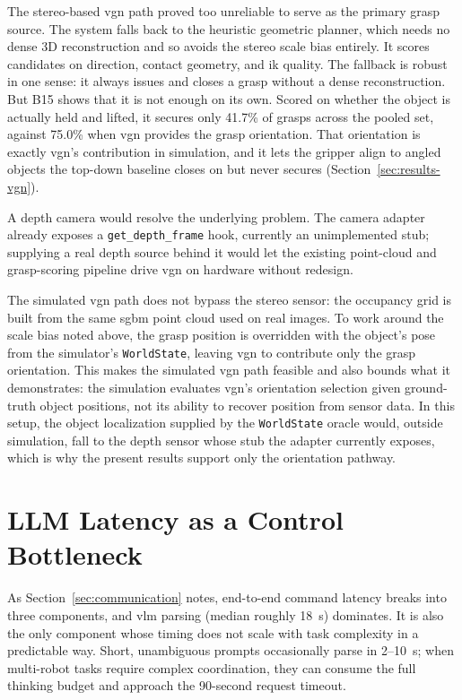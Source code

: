 \documentclass[
     12pt,
     a4paper,
     BCOR=10mm,
     DIV=14,
     listof=totoc,
     bibliography=totoc,
     parskip,
     twoside,
     headsepline
     ]{scrreprt}
\begin{document}
The stereo-based \gls{vgn} path proved too unreliable to serve as the primary grasp source. The system falls back to the heuristic geometric planner, which needs no dense 3D reconstruction and so avoids the stereo scale bias entirely. It scores candidates on direction, contact geometry, and \gls{ik} quality. The fallback is robust in one sense: it always issues and closes a grasp without a dense reconstruction. But B15 shows that it is not enough on its own. Scored on whether the object is actually held and lifted, it secures only 41.7\% of grasps across the pooled set, against 75.0\% when \gls{vgn} provides the grasp orientation. That orientation is exactly \gls{vgn}'s contribution in simulation, and it lets the gripper align to angled objects the top-down baseline closes on but never secures (Section~\ref{sec:results-vgn}).

A depth camera would resolve the underlying problem. The camera adapter already exposes a \texttt{get\_depth\_frame} hook, currently an unimplemented stub; supplying a real depth source behind it would let the existing point-cloud and grasp-scoring pipeline drive \gls{vgn} on hardware without redesign.

The simulated \gls{vgn} path does not bypass the stereo sensor: the occupancy grid is built from the same \gls{sgbm} point cloud used on real images. To work around the scale bias noted above, the grasp position is overridden with the object's pose from the simulator's \texttt{WorldState}, leaving \gls{vgn} to contribute only the grasp orientation. This makes the simulated \gls{vgn} path feasible and also bounds what it demonstrates: the simulation evaluates \gls{vgn}'s orientation selection given ground-truth object positions, not its ability to recover position from sensor data. In this setup, the object localization supplied by the \texttt{WorldState} oracle would, outside simulation, fall to the depth sensor whose stub the adapter currently exposes, which is why the present results support only the orientation pathway.

\section{LLM Latency as a Control Bottleneck}
As Section~\ref{sec:communication} notes, end-to-end command latency breaks into three components, and \gls{vlm} parsing (median roughly 18~s) dominates. It is also the only component whose timing does not scale with task complexity in a predictable way. Short, unambiguous prompts occasionally parse in 2--10~s; when multi-robot tasks require complex coordination, they can consume the full thinking budget and approach the 90-second request timeout.
\end{document}
